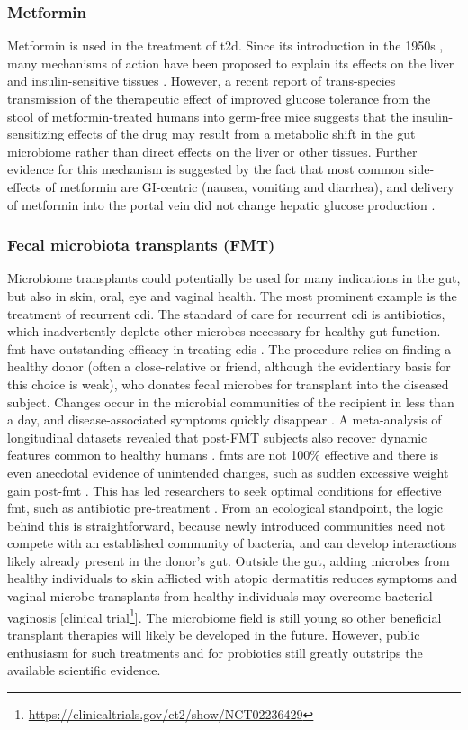 \subsubsection{Metformin}
Metformin is used in the treatment of \gls{t2d}. Since its introduction in the 1950s \cite{RN4103}, many mechanisms of action have been proposed to explain its effects on the liver and insulin-sensitive tissues \cite{RN4126}. However, a recent report of trans-species transmission of the therapeutic effect of improved glucose tolerance from the stool of metformin-treated humans into germ-free mice \cite{RN4127} suggests that the insulin-sensitizing effects of the drug may result from a metabolic shift in the gut microbiome rather than direct effects on the liver or other tissues. Further evidence for this mechanism is suggested by the fact that most common side-effects of metformin are GI-centric (nausea, vomiting and diarrhea), and delivery of metformin into the portal vein did not change hepatic glucose production \cite{RN4128}.

\subsubsection{Fecal microbiota transplants (FMT)}
Microbiome transplants could potentially be used for many indications in the gut, but also in skin, oral, eye and vaginal health. The most prominent example is the treatment of recurrent \gls{cdi}. The standard of care for recurrent \gls{cdi} is antibiotics, which inadvertently deplete other microbes necessary for healthy gut function. \Gls{fmt} have outstanding efficacy in treating \glspl{cdi} \cite{RN4129}. The procedure relies on finding a healthy donor (often a close-relative or friend, although the evidentiary basis for this choice is weak), who donates fecal microbes for transplant into the diseased subject. Changes occur in the microbial communities of the recipient in less than a day, and disease-associated symptoms quickly disappear \cite{RN1471}. A meta-analysis of longitudinal datasets revealed that post-FMT subjects also recover dynamic features common to healthy humans \cite{RN4131}. \Glspl{fmt} are not 100\% effective and there is even anecdotal evidence of unintended changes, such as sudden excessive weight gain post-\gls{fmt} \cite{RN4132}. This has led researchers to seek optimal conditions for effective \gls{fmt}, such as antibiotic pre-treatment \cite{RN4134, RN4133}. From an ecological standpoint, the logic behind this is straightforward, because newly introduced communities need not compete with an established community of bacteria, and can develop interactions likely already present in the donor's gut. Outside the gut, adding microbes from healthy individuals to skin afflicted with atopic dermatitis reduces symptoms \cite{RN4135} and vaginal microbe transplants from healthy individuals may overcome bacterial vaginosis [clinical trial\footnote{\url{https://clinicaltrials.gov/ct2/show/NCT02236429}}]. The microbiome field is still young so other beneficial transplant therapies will likely be developed in the future. However, public enthusiasm for such treatments and for probiotics still greatly outstrips the available scientific evidence.

